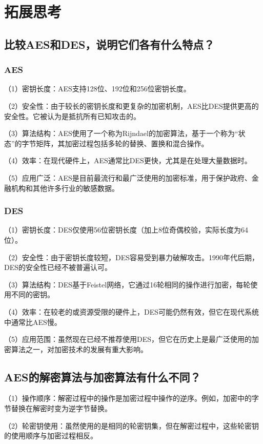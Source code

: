 \documentclass[a4paper,11pt,UTF8]{ctexart}
\begin{document}
\section{拓展思考}
    \subsection{比较AES和DES，说明它们各有什么特点？}
        \subsubsection{AES}
            （1）密钥长度：AES支持128位、192位和256位密钥长度。\par
            （2）安全性：由于较长的密钥长度和更复杂的加密机制，AES比DES提供更高的安全性。它被认为是抵抗所有已知攻击的。\par
            （3）算法结构：AES使用了一个称为Rijndael的加密算法，基于一个称为“状态”的字节矩阵，其加密过程包括多轮的替换、置换和混合操作。\par
            （4）效率：在现代硬件上，AES通常比DES更快，尤其是在处理大量数据时。\par
            （5）应用广泛：AES是目前最流行和最广泛使用的加密标准，用于保护政府、金融机构和其他许多行业的敏感数据。
        \subsubsection{DES}
            （1）密钥长度：DES仅使用56位密钥长度（加上8位奇偶校验，实际长度为64位）。\par
            （2）安全性：由于密钥长度较短，DES容易受到暴力破解攻击。1990年代后期，DES的安全性已经不被普遍认可。\par
            （3）算法结构：DES基于Feistel网络，它通过16轮相同的操作进行加密，每轮使用不同的密钥。\par
            （4）效率：在较老的或资源受限的硬件上，DES可能仍然有效，但它在现代系统中通常比AES慢。\par
            （5）应用范围：虽然现在已经不推荐使用DES，但它在历史上是最广泛使用的加密算法之一，对加密技术的发展有重大影响。

    \subsection{AES的解密算法与加密算法有什么不同？}
        （1）操作顺序：解密过程中的操作是加密过程中操作的逆序。例如，加密中的字节替换在解密时变为逆字节替换。\par
        （2）轮密钥使用：虽然使用的是相同的轮密钥集，但在解密过程中，这些轮密钥的使用顺序与加密过程相反。
        
\end{document}
